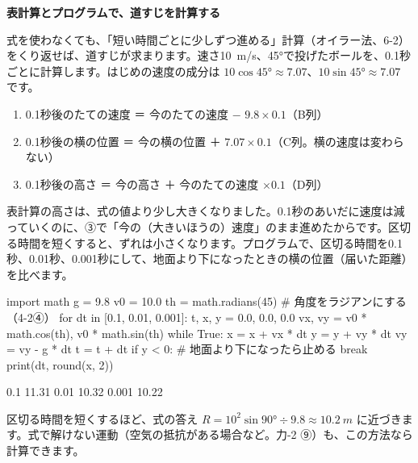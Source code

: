 \noindent\textbf{表計算とプログラムで、道すじを計算する}\par
\noindent 式を使わなくても、「短い時間ごとに少しずつ進める」計算（オイラー法、6-2）をくり返せば、道すじが求まります。速さ\qty{10}{m/s}、45°で投げたボールを、0.1秒ごとに計算します。はじめの速度の成分は $10\cos45°\approx7.07$、$10\sin45°\approx7.07$ です。
\begin{enumerate}[label={\bkcircled{\arabic*}}, leftmargin=2.4\zw, itemsep=1pt, topsep=2pt]
\item 0.1秒後のたての速度 ＝ 今のたての速度 $-$ $9.8\times0.1$（B列）
\item 0.1秒後の横の位置 ＝ 今の横の位置 ＋ $7.07\times0.1$（C列。横の速度は変わらない）
\item 0.1秒後の高さ ＝ 今の高さ ＋ 今のたての速度 $\times0.1$（D列）
\end{enumerate}
\begin{bkcenter}
\end{bkcenter}
表計算の高さは、式の値より少し大きくなりました。0.1秒のあいだに速度は減っていくのに、③で「今の（大きいほうの）速度」のまま進めたからです。区切る時間を短くすると、ずれは小さくなります。プログラムで、区切る時間を0.1秒、0.01秒、0.001秒にして、地面より下になったときの横の位置（届いた距離）を比べます。
\begin{phcode}
import math
g = 9.8
v0 = 10.0
th = math.radians(45)    \# 角度をラジアンにする（4-2④）
for dt in [0.1, 0.01, 0.001]:
    t, x, y = 0.0, 0.0, 0.0
    vx, vy = v0 * math.cos(th), v0 * math.sin(th)
    while True:
        x = x + vx * dt
        y = y + vy * dt
        vy = vy - g * dt
        t = t + dt
        if y < 0:          \# 地面より下になったら止める
            break
    print(dt, round(x, 2))
\end{phcode}
\begin{phcodeout}
0.1 11.31
0.01 10.32
0.001 10.22
\end{phcodeout}
区切る時間を短くするほど、式の答え $R=10^2\sin90°\div9.8\approx\qty{10.2}{m}$ に近づきます。式で解けない運動（空気の抵抗がある場合など。力-2 ⑨）も、この方法なら計算できます。



